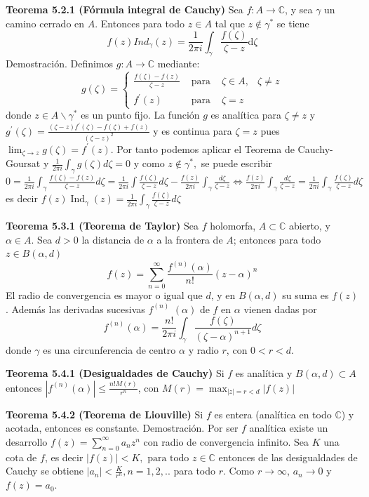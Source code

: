 \documentclass[a4paper, 11pt]{extarticle}
\newcommand{\tma}[1]{\textcolor{rojo}{\textbf{Teorema #1}}}
\newcommand{\dem}[1]{\textcolor{gris}{\small{Demostración. #1}}}
\begin{document}
\begin{multicols*}{2}
\tma{5.2.1 (Fórmula integral de Cauchy)} Sea \(f: A \rightarrow  \mathbb{C}\),
y sea \(\gamma\) un camino cerrado en \(A\). Entonces para todo \(z \in A\) tal que \(z \not \in \gamma^*\)
 se tiene \[ f(z) Ind_\gamma(z) = \frac{1}{2\pi i}\int _\gamma
\frac{f(\zeta)}{\zeta - z} \text{d}\zeta   \]
\dem{  Definimos $g: A \rightarrow \mathbb{C}$ mediante:
$$
g(\zeta)=\left\{\begin{array}{cccc}
\frac{f(\zeta)-f(z)}{\zeta-z} & \text { para } & \zeta \in A, & \zeta \neq z \\
f^{\prime}(z) & \text { para } & \zeta=z
\end{array}\right.
$$
donde $z \in A \backslash \gamma^{*}$ es un punto fijo. La función $g$ es analítica para $\zeta \neq z$ y
$
g^{\prime}(\zeta)=\frac{(\zeta-z) f^{\prime}(\zeta)-f(\zeta)+f(z)}{(\zeta-z)^{2}}
$
y es continua para $\zeta=z$ pues
$
\lim _{\zeta \rightarrow z} g(\zeta)=f^{\prime}(z)
$.
Por tanto podemos aplicar el Teorema de Cauchy-Goursat y 
$
\frac{1}{2 \pi i} \int_{\gamma} g(\zeta) d \zeta=0
$ y como $z \notin \gamma^{*},$ se puede escribir
$
0 =\frac{1}{2 \pi i} \int_{\gamma} \frac{f(\zeta)-f(z)}{\zeta-z} d \zeta=\frac{1}{2 \pi i} \int \frac{f(\zeta)}{\zeta-z} d \zeta 
-\frac{f(z)}{2 \pi i} \int_{\gamma} \frac{d \zeta}{\zeta-z} \iff \frac{f(z)}{2 \pi i} 
\int_{\gamma} \frac{d \zeta}{\zeta-z}=\frac{1}{2 \pi i} \int_{\gamma} \frac{f(\zeta)}{\zeta-z} d \zeta
$
es decir
$f(z) \operatorname{Ind}_{\gamma}(z)=\frac{1}{2 \pi i} \int_{\gamma} \frac{f(\zeta)}{\zeta-z} d \zeta$ }

\tma{5.3.1 (Teorema de Taylor)} 
Sea \(f\) holomorfa, \(A \subset \mathbb{C}\) abierto,
y \(\alpha \in A\). Sea \(d>0\) la distancia de \(\alpha\) a la frontera de \(A\); 
entonces para todo \(z \in B(\alpha, d)\)
$$
f(z)=\sum_{n=0}^{\infty} \frac{f^{(n)}(\alpha)}{n !}(z-\alpha)^{n}
$$
El radio de convergencia es mayor o igual que
\(d\), y en \(B(\alpha, d)\) su suma es \(f(z)\). 
Además las derivadas sucesivas \(f^{(n)}\) \((\alpha)\) de \(f\) en \(\alpha\) vienen dadas por
$$
f^{(n)}(\alpha)=\frac{n !}{2 \pi i} \int_{\gamma} \frac{f(\zeta)}{(\zeta-\alpha)^{n+1}} d \zeta
$$
donde \(\gamma\) es una circunferencia de centro \(\alpha\) y radio \(r\), con
\(0<r<d\).

\tma{5.4.1 (Desigualdades de Cauchy)} Si \(f\) es analítica y \(B(\alpha, d)
\subset A\) entonces 
\(|f^{(n)}(\alpha)| \le \frac{n!M(r)}{r^n}\), con \(M(r) =
\max_{|z|=r<d}|f(z)|\)

\tma{5.4.2 (Teorema de Liouville)} Si \(f\) es entera (analítica en todo \(\mathbb{C}\)) y acotada, entonces es constante.
\dem{  Por ser $f$ analítica existe un desarrollo
$
f(z)=\sum_{n=0}^{\infty} a_{n} z^{n}
$
con radio de convergencia infinito. Sea $K$ una cota de $f$, es decir
$
|f(z)|<K, \text { para todo } z \in \mathbb{C}
$
entonces de las desigualdades de Cauchy se obtiene
$
\left|a_{n}\right|<\frac{K}{r^{n}}, n=1,2, . .
$
para todo $r$. Como \( r \rightarrow \infty \), \( a_n \rightarrow 0 \) y \( f(z) = a_0 \). }


\end{multicols*}
\end{document}
